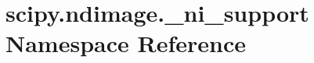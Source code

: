\hypertarget{namespacescipy_1_1ndimage_1_1__ni__support}{}\section{scipy.\+ndimage.\+\_\+ni\+\_\+support Namespace Reference}
\label{namespacescipy_1_1ndimage_1_1__ni__support}
